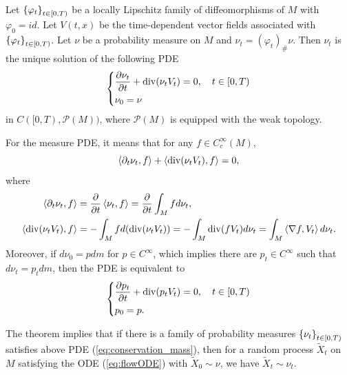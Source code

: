 \begin{thm}
    Let $\left\{\varphi_t\right\}_{t \in [0,T)}$ be a locally Lipschitz family of diffeomorphisms of $M$ with $\varphi_0 = id$. Let $V(t,x)$ be the time-dependent vector fields associated with $\left\{\varphi_t\right\}_{t \in [0,T)}$. Let $\nu$ be a probability measure on $M$ and $\nu_t = (\varphi_t)_{\#}\nu$. Then $\nu_t$ is the unique solution of the following PDE 
    \begin{equation}\label{eq:conservation_mass}
        \left\{
            \begin{aligned}
                & \frac{\partial \nu_t}{\partial t} + \operatorname{div}(\nu_tV_t) = 0,\quad t \in [0,T)\\
                & \nu_0 = \nu
            \end{aligned}
        \right.
    \end{equation}
    in $C([0,T),\mathcal{P}(M))$, where $\mathcal{P}(M)$ is equipped with the weak topology.
\end{thm}
\begin{rmk}
    For the measure PDE, it means that for any $f \in C_c^\infty(M)$,
    \begin{equation*}
        \left\langle \partial_t \nu_t,f \right\rangle+\left\langle \operatorname{div}(\nu_tV_t),f \right\rangle = 0,
    \end{equation*}
    where
    \begin{align*}
        \left\langle \partial_t \nu_t,f \right\rangle &= \frac{\partial}{\partial t}\left\langle \nu_t,f \right\rangle = \frac{\partial}{\partial t} \int_M fd\nu_t, \\
        \left\langle \operatorname{div}(\nu_tV_t),f \right\rangle &= -\int_M f d(\operatorname{div}(\nu_tV_t)) = -\int_M \operatorname{div}(f V_t) d\nu_t = \int_M \left\langle \nabla f,V_t \right\rangle d\nu_t.
    \end{align*}
    Moreover, if $d\nu_0 = pdm$ for $p \in C^\infty$, which implies there are $p_t \in C^\infty$ such that $d\nu_t = p_t dm$, then the PDE is equivalent to
    \begin{equation*}
        \left\{
            \begin{aligned}
                & \frac{\partial p_t}{\partial t} + \operatorname{div}(p_tV_t) = 0,\quad t \in [0,T)\\
                & p_0 = p.
            \end{aligned}
        \right.
    \end{equation*}
\end{rmk}
The theorem implies that if there is a family of probability measures $\left\{\nu_t\right\}_{t \in [0,T)}$ satisfies above PDE (\ref{eq:conservation_mass}), then for a random process $\widetilde{X}_t$ on $M$ satisfying the ODE (\ref{eq:flowODE}) with $\widetilde{X}_0 \sim \nu$, we have $\widetilde{X}_t \sim \nu_t$.

